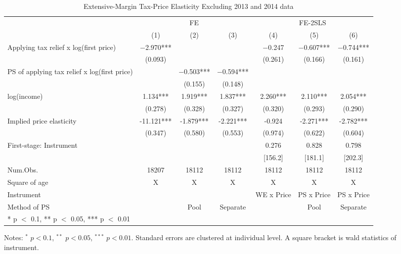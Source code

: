 \documentclass[
  11pt,
  a4paper,
]{article}
\begin{document}
\begin{table}[!h]

\caption{\label{tab:WoAnnouncementExtensive}Extensive-Margin Tax-Price Elasticity Excluding 2013 and 2014 data}
\centering
\fontsize{8}{10}\selectfont
\begin{threeparttable}
\begin{tabular}[t]{lcccccc}
\toprule
\multicolumn{1}{c}{ } & \multicolumn{3}{c}{FE} & \multicolumn{3}{c}{FE-2SLS} \\
\cmidrule(l{3pt}r{3pt}){2-4} \cmidrule(l{3pt}r{3pt}){5-7}
  & (1) & (2) & (3) & (4) & (5) & (6)\\
\midrule
Applying tax relief x log(first price) & \num{-2.970}*** &  &  & \num{-0.247} & \num{-0.607}*** & \num{-0.744}***\\
 & (\num{0.093}) &  &  & (\num{0.261}) & (\num{0.166}) & (\num{0.161})\\
PS of applying tax relief x log(first price) &  & \num{-0.503}*** & \num{-0.594}*** &  &  & \\
 &  & (\num{0.155}) & (\num{0.148}) &  &  & \\
log(income) & \num{1.134}*** & \num{1.919}*** & \num{1.837}*** & \num{2.260}*** & \num{2.110}*** & \num{2.054}***\\
 & (\num{0.278}) & (\num{0.328}) & (\num{0.327}) & (\num{0.320}) & (\num{0.293}) & (\num{0.290})\\
\midrule
Implied price elasticity & -11.121*** & -1.879*** & -2.221*** & -0.924 & -2.271*** & -2.782***\\
 & (0.347) & (0.580) & (0.553) & (0.974) & (0.622) & (0.604)\\
First-stage: Instrument &  &  &  & 0.276 & 0.828 & 0.798\\
 &  &  &  & [156.2] & [181.1] & [202.3]\\
Num.Obs. & \num{18207} & \num{18112} & \num{18112} & \num{18112} & \num{18112} & \num{18112}\\
Square of age & X & X & X & X & X & X\\
Instrument &  &  &  & WE x Price & PS x Price & PS x Price\\
Method of PS &  & Pool & Separate &  & Pool & Separate\\
\bottomrule
\multicolumn{7}{l}{\rule{0pt}{1em}* p $<$ 0.1, ** p $<$ 0.05, *** p $<$ 0.01}\\
\end{tabular}
\begin{tablenotes}
\item Notes: $^{*}$ $p < 0.1$, $^{**}$ $p < 0.05$, $^{***}$ $p < 0.01$. Standard errors are clustered at individual level. A square bracket is wald statistics of instrument.
\end{tablenotes}
\end{threeparttable}
\end{table}
\end{document}
